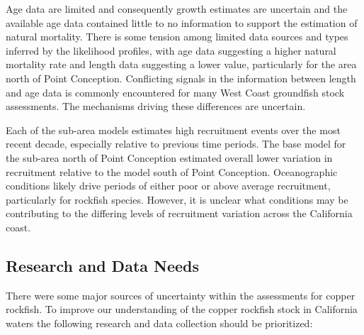 \documentclass[11pt,
  english,
  letterpaper,
]{article}
\begin{document}
Age data are limited and consequently growth estimates are uncertain and the available age data contained little to no information to support the estimation of natural mortality. There is some tension among limited data sources and types inferred by the likelihood profiles, with age data suggesting a higher natural mortality rate and length data suggesting a lower value, particularly for the area north of Point Conception. Conflicting signals in the information between length and age data is commonly encountered for many West Coast groundfish stock assessments. The mechanisms driving these differences are uncertain.

Each of the sub-area models estimates high recruitment events over the most recent decade, especially relative to previous time periods. The base model for the sub-area north of Point Conception estimated overall lower variation in recruitment relative to the model south of Point Conception. Oceanographic conditions likely drive periods of either poor or above average recruitment, particularly for rockfish species. However, it is unclear what conditions may be contributing to the differing levels of recruitment variation across the California coast.

\hypertarget{research-and-data-needs-1}{%
\subsection{Research and Data Needs}\label{research-and-data-needs-1}}

There were some major sources of uncertainty within the assessments for copper rockfish. To improve our understanding of the copper rockfish stock in California waters the following research and data collection should be prioritized:
\end{document}
